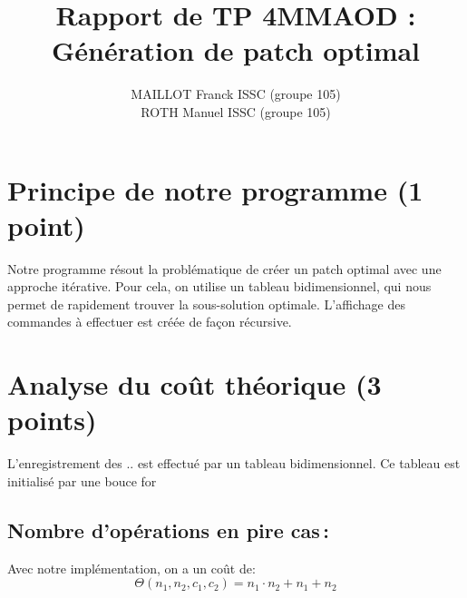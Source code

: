 \documentclass[a4paper, 10pt, english]{article}
\title{Rapport de TP 4MMAOD : Génération de patch optimal}
\author{
MAILLOT Franck ISSC (groupe 105) 
\\ ROTH Manuel ISSC (groupe 105) 
}
\begin{document}
\maketitle


\section{Principe de notre  programme (1 point)}
Notre programme résout la problématique de créer un patch optimal avec une approche itérative. Pour cela, on utilise un tableau bidimensionnel,
qui nous permet de rapidement trouver la sous-solution optimale. L'affichage des commandes à effectuer est créée de fa\c{c}on récursive.

\section{Analyse du coût théorique (3 points)}
L'enregistrement des .. est effectué par un tableau bidimensionnel. Ce tableau est initialisé par une bouce for

\subsection{Nombre  d'opérations en pire cas\,: }
Avec notre implémentation, on a un coût de:\\
\[
\Theta(n_1,n_2,c_1,c_2) = n_1 \cdot n_2 + n_1 + n_2 
\]
\end{document}
